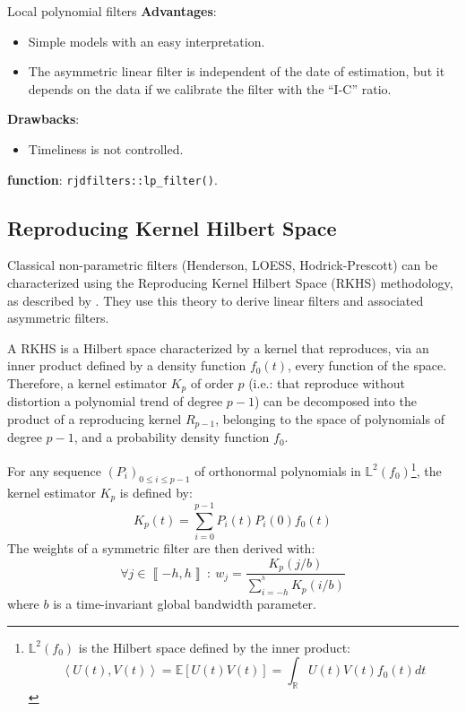 \documentclass[fleqn,10pt]{latex/stylish_article} %
\providecommand{\tightlist}{%
  \setlength{\itemsep}{0pt}\setlength{\parskip}{0pt}}
\newcommand\1{\mathds{1}}
\begin{document}
\begin{summary}{Local polynomial filters}
\textbf{Advantages}:

\begin{itemize}
\item
  Simple models with an easy interpretation.
\item
  The asymmetric linear filter is independent of the date of estimation, but it depends on the data if we calibrate the filter with the ``I-C'' ratio.
\end{itemize}

\textbf{Drawbacks}:

\begin{itemize}
\tightlist
\item
  Timeliness is not controlled.
\end{itemize}

\textbf{\faRProject{} function}: \texttt{rjdfilters::lp\_filter()}.

\end{summary}

\hypertarget{sec:Dagum}{%
\subsection{Reproducing Kernel Hilbert Space}\label{sec:Dagum}}

Classical non-parametric filters (Henderson, LOESS, Hodrick-Prescott) can be characterized using the Reproducing Kernel Hilbert Space (RKHS) methodology, as described by \citet{dagumbianconcini2008}.
They use this theory to derive linear filters and associated asymmetric filters.

A RKHS is a Hilbert space characterized by a kernel that reproduces, via an inner product defined by a density function \(f_0(t)\), every function of the space.
Therefore, a kernel estimator \(K_p\) of order \(p\) (i.e.: that reproduce without distortion a polynomial trend of degree \(p-1\)) can be decomposed into the product of a reproducing kernel \(R_{p-1}\), belonging to the space of polynomials of degree \(p-1\), and a probability density function \(f_0\).

For any sequence \(\left(P_{i}\right)_{0\leq i\leq p-1}\) of orthonormal polynomials in \(\mathbb{L}^{2}(f_{0})\)\footnote{
  \(\mathbb{L}^{2}(f_{0})\) is the Hilbert space defined by the inner product:
  \[
  \left\langle U(t),V(t)\right\rangle =\mathbb E\left[U(t)V(t)\right]=\int_{\mathbb R}U(t)V(t)f_{0}(t)d t
  \]}, the kernel estimator \(K_p\) is defined by:
\[
K_{p}(t)=\sum_{i=0}^{p-1}P_{i}(t)P_{i}(0)f_{0}(t)
\]
The weights of a symmetric filter are then derived with:
\[
\forall j\in\left\llbracket -h,h\right\rrbracket\::\: w_{j}=\frac{K_p(j/b)}{\sum_{i=-h}^{^h}K_p(i/b)}
\]
where \(b\) is a time-invariant global bandwidth parameter.
\end{document}
